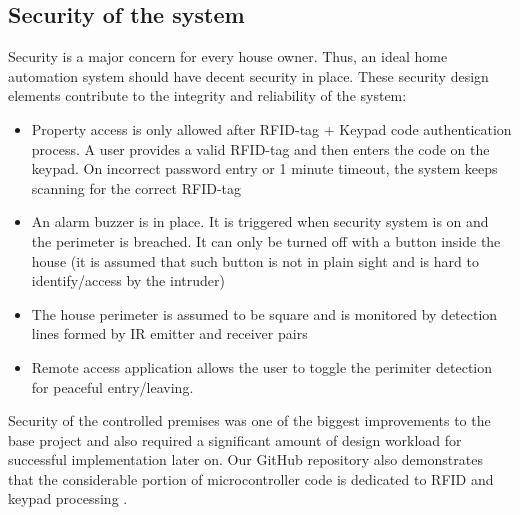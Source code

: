 \documentclass[journal,onecolumn]{IEEEtran}
\begin{document}
\subsection{Security of the system}
Security is a major concern for every house owner. Thus, an ideal home automation system should have decent security in place. These security design elements contribute to the integrity and reliability of the system:
\begin{itemize}
    \item {Property access is only allowed after RFID-tag + Keypad code authentication process. A user provides a valid RFID-tag and then enters the code on the keypad. On incorrect password entry or 1 minute timeout, the system keeps scanning for the correct RFID-tag}
    \item {An alarm buzzer is in place. It is triggered when security system is on and the perimeter is breached. It can only be turned off with a button inside the house (it is assumed that such button is not in plain sight and is hard to identify/access by the intruder)}
    \item {The house perimeter is assumed to be square and is monitored by detection lines formed by IR emitter and receiver pairs}
    \item {Remote access application allows the user to toggle the perimiter detection for peaceful entry/leaving.}
\end{itemize}

Security of the controlled premises was one of the biggest improvements to the base project and also required a significant amount of design workload for successful implementation later on. Our GitHub repository also demonstrates that the considerable portion of microcontroller code is dedicated to RFID and keypad processing \cite{git:git}. 
\end{document}
